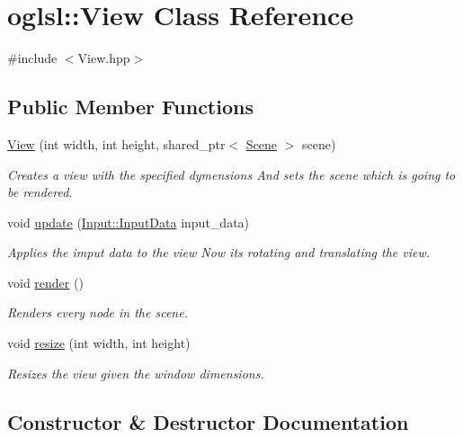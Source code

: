\hypertarget{classoglsl_1_1_view}{}\section{oglsl\+:\+:View Class Reference}
\label{classoglsl_1_1_view}


{\ttfamily \#include $<$View.\+hpp$>$}

\subsection*{Public Member Functions}
\begin{DoxyCompactItemize}
\item 
\mbox{\hyperlink{classoglsl_1_1_view_ae7f67b78cdd174449edc93960f29d9f4}{View}} (int width, int height, shared\+\_\+ptr$<$ \mbox{\hyperlink{classoglsl_1_1_scene}{Scene}} $>$ scene)
\begin{DoxyCompactList}\small\item\em Creates a view with the specified dymensions And sets the scene which is going to be rendered. \end{DoxyCompactList}\item 
void \mbox{\hyperlink{classoglsl_1_1_view_ac0b18fc4d2abe1abca6940c55313ef3b}{update}} (\mbox{\hyperlink{classoglsl_1_1_input_a3b21d7328538e661f366af5d6059c197}{Input\+::\+Input\+Data}} input\+\_\+data)
\begin{DoxyCompactList}\small\item\em Applies the imput data to the view Now it\textquotesingle{}s rotating and translating the view. \end{DoxyCompactList}\item 
void \mbox{\hyperlink{classoglsl_1_1_view_a10ea89fc705a2ba2252f673499524bf2}{render}} ()
\begin{DoxyCompactList}\small\item\em Renders every node in the scene. \end{DoxyCompactList}\item 
void \mbox{\hyperlink{classoglsl_1_1_view_a2396337a1db393acefb174e386cde7d1}{resize}} (int width, int height)
\begin{DoxyCompactList}\small\item\em Resizes the view given the window dimensions. \end{DoxyCompactList}\end{DoxyCompactItemize}


\subsection{Constructor \& Destructor Documentation}
\mbox{\label{classoglsl_1_1_view_ae7f67b78cdd174449edc93960f29d9f4}} 

